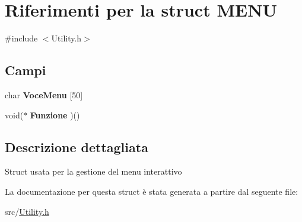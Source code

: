 \hypertarget{struct_m_e_n_u}{}\section{Riferimenti per la struct M\+E\+NU}
\label{struct_m_e_n_u}


{\ttfamily \#include $<$Utility.\+h$>$}

\subsection*{Campi}
\begin{DoxyCompactItemize}
\item 
\mbox{\label{struct_m_e_n_u_a2fc51fc20d1d29a605b0628e2069c6f3}} 
char {\bfseries Voce\+Menu} \mbox{[}50\mbox{]}
\item 
\mbox{\label{struct_m_e_n_u_a576264ef217a1b83c25367a8f10d718b}} 
void($\ast$ {\bfseries Funzione} )()
\end{DoxyCompactItemize}


\subsection{Descrizione dettagliata}
Struct usata per la gestione del menu\textquotesingle{} interattivo 

La documentazione per questa struct è stata generata a partire dal seguente file\+:\begin{DoxyCompactItemize}
\item 
src/\hyperlink{_utility_8h}{Utility.\+h}\end{DoxyCompactItemize}
